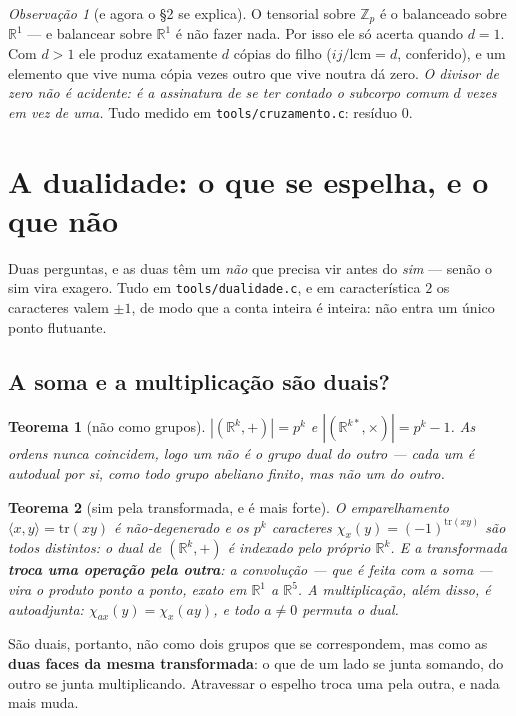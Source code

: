\documentclass[11pt]{article}
\newcommand{\code}[1]{\texttt{\small #1}}
\newcommand{\Z}{\mathbb Z}
\newcommand{\R}{\mathbb R}
\theoremstyle{plain}
\newtheorem{teorema}{Teorema}
\theoremstyle{remark}
\newtheorem{obs}{Observação}
\begin{document}
\begin{obs}[e agora o §2 se explica]
O tensorial sobre $\Z_p$ é o balanceado sobre $\R^1$ --- e balancear sobre $\R^1$ é não fazer nada.
Por isso ele só acerta quando $d=1$. Com $d>1$ ele produz exatamente $d$ cópias do filho
($ij/\mathrm{lcm}=d$, conferido), e um elemento que vive numa cópia vezes outro que vive noutra dá
zero. \emph{O divisor de zero não é acidente: é a assinatura de se ter contado o subcorpo comum $d$
vezes em vez de uma.} Tudo medido em \code{tools/cruzamento.c}: resíduo $0$.
\end{obs}

\section{A dualidade: o que se espelha, e o que não}

Duas perguntas, e as duas têm um \emph{não} que precisa vir antes do \emph{sim} --- senão o sim
vira exagero. Tudo em \code{tools/dualidade.c}, e em característica $2$ os caracteres valem $\pm1$,
de modo que a conta inteira é inteira: não entra um único ponto flutuante.

\subsection*{A soma e a multiplicação são duais?}

\begin{teorema}[não como grupos]
$|(\R^k,+)|=p^k$ e $|(\R^{k*},\times)|=p^k-1$. As ordens nunca coincidem, logo um não é o grupo dual
do outro --- cada um é autodual por si, como todo grupo abeliano finito, mas não um do outro.
\end{teorema}

\begin{teorema}[sim pela transformada, e é mais forte]
O emparelhamento $\langle x,y\rangle=\mathrm{tr}(xy)$ é não-degenerado e os $p^k$ caracteres
$\chi_x(y)=(-1)^{\mathrm{tr}(xy)}$ são todos distintos: o dual de $(\R^k,+)$ é indexado pelo próprio
$\R^k$. E a transformada \textbf{troca uma operação pela outra}: a convolução --- que é feita com a
\emph{soma} --- vira o \emph{produto} ponto a ponto, exato em $\R^1$ a $\R^5$. A multiplicação, além
disso, é autoadjunta: $\chi_{ax}(y)=\chi_x(ay)$, e todo $a\ne0$ permuta o dual.
\end{teorema}

\noindent São duais, portanto, não como dois grupos que se correspondem, mas como as \textbf{duas
faces da mesma transformada}: o que de um lado se junta somando, do outro se junta multiplicando.
Atravessar o espelho troca uma pela outra, e nada mais muda.
\end{document}
